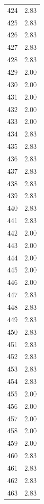 \documentclass[a4paper,11pt]{article}
\begin{document}
\begin{center}
\begin{longtable}{|R{1.5cm}|R{2.5cm}|}
  424  &         2.83 \\ 
  425  &         2.83 \\ 
  426  &         2.83 \\ 
  427  &         2.83 \\ 
  428  &         2.83 \\ 
  429  &         2.00 \\ 
  430  &         2.00 \\ 
  431  &         2.00 \\ 
  432  &         2.00 \\ 
  433  &         2.00 \\ 
  434  &         2.83 \\ 
  435  &         2.83 \\ 
  436  &         2.83 \\ 
  437  &         2.83 \\ 
  438  &         2.83 \\ 
  439  &         2.83 \\ 
  440  &         2.83 \\ 
  441  &         2.83 \\ 
  442  &         2.00 \\ 
  443  &         2.00 \\ 
  444  &         2.00 \\ 
  445  &         2.00 \\ 
  446  &         2.00 \\ 
  447  &         2.83 \\ 
  448  &         2.83 \\ 
  449  &         2.83 \\ 
  450  &         2.83 \\ 
  451  &         2.83 \\ 
  452  &         2.83 \\ 
  453  &         2.83 \\ 
  454  &         2.83 \\ 
  455  &         2.00 \\ 
  456  &         2.00 \\ 
  457  &         2.00 \\ 
  458  &         2.00 \\ 
  459  &         2.00 \\ 
  460  &         2.83 \\ 
  461  &         2.83 \\ 
  462  &         2.83 \\ 
  463  &         2.83 \\ 

\end{longtable}
\end{center}
\end{document}
